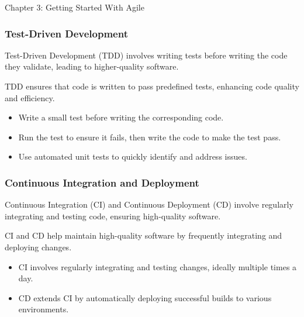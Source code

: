 \begin{notes}{Chapter 3: Getting Started With Agile}
    \subsubsection*{Test-Driven Development}
    
    Test-Driven Development (TDD) involves writing tests before writing the code they validate, leading to higher-quality software.
    
    \begin{highlight}
    
        TDD ensures that code is written to pass predefined tests, enhancing code quality and efficiency.
        
        \begin{itemize}
            \item Write a small test before writing the corresponding code.
            \item Run the test to ensure it fails, then write the code to make the test pass.
            \item Use automated unit tests to quickly identify and address issues.
        \end{itemize}
    
    \end{highlight}
    
    \subsubsection*{Continuous Integration and Deployment}
    
    Continuous Integration (CI) and Continuous Deployment (CD) involve regularly integrating and testing code, ensuring high-quality software.
    
    \begin{highlight}
    
        CI and CD help maintain high-quality software by frequently integrating and deploying changes.
        
        \begin{itemize}
            \item CI involves regularly integrating and testing changes, ideally multiple times a day.
            \item CD extends CI by automatically deploying successful builds to various environments.
        \end{itemize}
    
    \end{highlight}
    

\end{notes}

